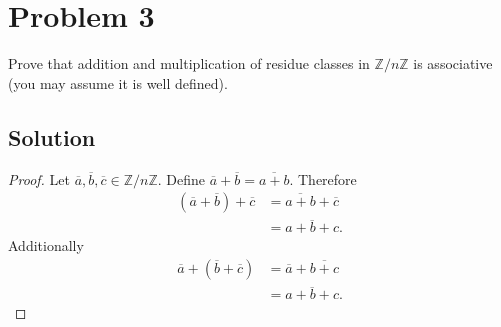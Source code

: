 \documentclass[12pt]{extarticle}
\begin{document}
\section*{Problem 3}
Prove that addition and multiplication of residue
classes in $\mathbb{Z} / n \mathbb{Z}$ is associative (you may assume it is well defined).

\subsection*{Solution}

\begin{proof}
	Let $\overline{a}, \overline{b}, \overline{c} \in \mathbb{Z}/ n \mathbb{Z}$. Define $\overline{a} + \overline{b} = \overline{a + b}$. Therefore
	\begin{align*}
		(\overline{a} + \overline{b}) + \overline{c} &= \overline{a + b} + \overline{c} \\
		&= \overline{a + b + c}
	.\end{align*}
	Additionally
	\begin{align*}
		\overline{a} + (\overline{b} + \overline{c}) &= \overline{a} + \overline{b + c} \\
		&= \overline{a + b + c}
	.\end{align*}
\end{proof}
\end{document}
